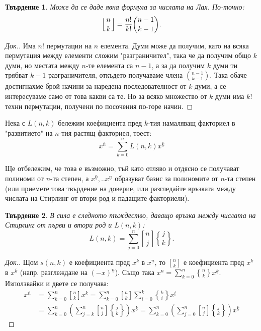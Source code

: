 \documentclass[12pt]{article}
\newcommand{\fallingfactorial}[1]{%
  ^{\underline{#1}}%
}
\newcommand{\risingfactorial}[1]{%
  ^{\overline{#1}}%
}
\newcommand{\genstirlingI}[3]{%
  \genfrac{[}{]}{0pt}{#1}{#2}{#3}%
}
\newcommand{\genstirlingII}[3]{%
  \genfrac{\{}{\}}{0pt}{#1}{#2}{#3}%
}
\newcommand{\stirlingI}[2]{\genstirlingI{}{#1}{#2}}
\newcommand{\stirlingII}[2]{\genstirlingII{}{#1}{#2}}
\newcommand{\genover}[3]{%
  \genfrac{}{}{0pt}{#1}{#2}{#3}%
}
\newcommand{\myover}[2]{\genover{}{#1}{#2}}
\newcommand{\lahfinal}[2]{\left\lfloor \myover{#1}{#2} \right\rfloor}
\newtheorem{theorem}{Твърдение}
\begin{document}
\begin{large}
\begin{theorem}
Може да се даде явна формула за числата на Лах. По-точно:
\[
\lahfinal{n}{k}=\frac{n!}{k!} \binom{n-1}{k-1}.
\]
\end{theorem}

\begin{proof}[Док.]
Има $n!$ пермутации на $n$ елемента. Думи може да получим, като на всяка пермутация между елементи сложим "разграничител", така че да получим общо $k$ думи, но местата между $n$-те елемента са $n-1$, а за да получим $k$ думи ти трябват $k-1$ разграничителя, откъдето получаваме члена $\binom{n-1}{k-1}$. Така обаче достигнахме брой начини за наредена последователност от $k$ думи, а се интересуваме само от това какви са те. Но за всяко множество от $k$ думи има $k!$ техни пермутации, получени по посочения по-горе начин.
\end{proof}


Нека с $L(n,k)$ бележим коефициента пред $k$-тия намаляващ факториел в "развитието" на $n$-тия растящ факториел, тоест:
\[
x\risingfactorial{n}=\sum_{k=0}^{n} L(n,k) x\fallingfactorial{k}
\]

Ще отбележим, че това е възможно, тъй като отляво и отдясно се получават полиноми от $n$-та степен, а ${x\fallingfactorial{0},..x\fallingfactorial{n}}$ образуват базис за полиномите от $n$-та степен (или приемете това твърдение на доверие, или разгледайте връзката между числата на Стирлинг от втори род и падащите факториели).

\begin{theorem}
В сила е следното тъждество, даващо връзка между числата на Стирлинг от първи и втори род и $L(n,k)$:
\[
L(n,k)=\sum_{j=0}^{n} \stirlingI{n}{j} \stirlingII{j}{k}.
\]
\end{theorem}

\begin{proof}[Док.]
Щом $s\left(n,k\right)$ е коефициента пред $x^{k}$ в $x\fallingfactorial{n}$, то $\stirlingI{n}{k}$ е коефициента пред $x^{k}$ в $x\risingfactorial{k}$ (напр. разглеждане на $(-x)\fallingfactorial{n}$).
Също така $x^n=\sum_{k=0}^{n} \stirlingII{n}{k} x\fallingfactorial{k}$. Използвайки и двете се получава:
\begin{equation*}
\begin{aligned}
    x\risingfactorial{n} &=
\sum_{k=0}^{n} \stirlingI{n}{k} x^{k} =
\sum_{k=0}^{n} \stirlingI{n}{k} \sum_{i=0}^{k} \stirlingII{k}{i} x\fallingfactorial{i} \\
&=
\sum_{k=0}^{n} \left(\sum_{j=k}^{n} \stirlingI{n}{j} \stirlingII{j}{k} \right) x\fallingfactorial{k} =
\sum_{k=0}^{n} \left(\sum_{j=0}^{n} \stirlingI{n}{j} \stirlingII{j}{k} \right) x\fallingfactorial{k}
\end{aligned}
\end{equation*}


\end{proof}
\end{large}
\end{document}
